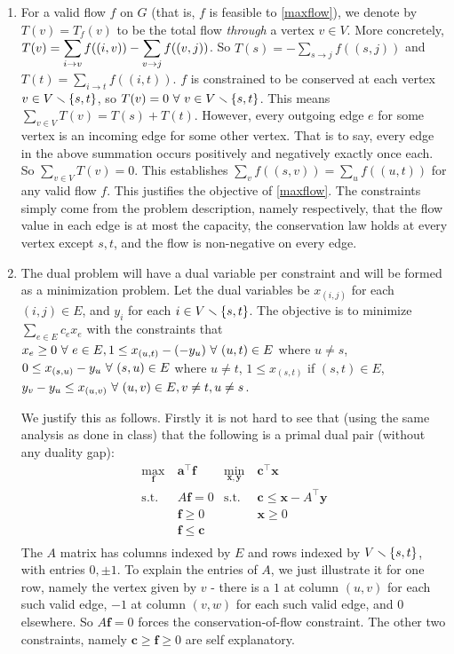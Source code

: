 \soln

\begin{enumerate}[label=(\alph*)]
\item For a valid flow $f$ on $G$ (that is, $f$ is feasible to \ref{maxflow}), we denote by $T(v) = T_{f}(v)$ to be the total flow \textit{through} a vertex $v\in V$. More concretely, $\displaystyle T(v) = \sum_{i\to v} f((i,v)) - \sum_{v\to j} f((v,j))$. So $T(s) = - \sum\limits_{s\to j} f((s,j))$ and $T(t) = \sum\limits_{i\to t} f((i,t))$. $f$ is constrained to be conserved at each vertex $v\in V\smallsetminus\left\{s,t\right\}$, so $T(v) = 0~\forall~ v\in V\smallsetminus\left\{s,t\right\}$. This means $\sum_{v\in V}T(v) = T(s) + T(t)$. However, every outgoing edge $e$ for some vertex is an incoming edge for some other vertex. That is to say, every edge in the above summation occurs positively and negatively exactly once each. So $\sum_{v\in V}T(v)=0$. This establishes $\sum_{v}f((s,v)) = \sum_{u}f((u,t))$ for any valid flow $f$. This justifies the objective of \ref{maxflow}. The constraints simply come from the problem description, namely respectively, that the flow value in each edge is at most the capacity, the conservation law holds at every vertex except $s,t$, and the flow is non-negative on every edge.
\item The dual problem will have a dual variable per constraint and will be formed as a minimization problem. Let the dual variables be $x_{(i,j)}$ for each $(i,j)\in E$, and $y_{i}$ for each $i\in V\smallsetminus\left\{s,t\right\}$. The objective is to minimize $\sum_{e\in E}c_{e}x_{e}$ with the constraints that $x_{e}\ge 0~\forall~ e\in E, 1 \le x_{(u,t)} - (-y_{u})~\forall~ (u,t)\in E$ where $u\ne s$, $0\le x_{(s,u)} - y_{u} ~\forall~ (s,u)\in E$ where $u\ne t$, $1\le x_{(s,t)}$ if $(s,t)\in E$, $y_{v}-y_{u}\le x_{(u,v)}~\forall~ (u,v)\in E, v\ne t, u\ne s$.

We justify this as follows. Firstly it is not hard to see that (using the same analysis as done in class) that the following is a primal dual pair (without any duality gap):
\begin{align*}
\max_{\pmb f}~& \pmb a^{\top}\pmb f & \min_{\pmb x,\pmb y}~ & \pmb c^{\top}\pmb x\\
\text{s.t. }& A\pmb f=0 & \text{s.t. } & \pmb c \le \pmb x - A^{\top}\pmb y\\
& \pmb f\ge 0 & & \pmb x\ge 0\\
& \pmb f\le \pmb c\\
\end{align*}
The $A$ matrix has columns indexed by $E$ and rows indexed by $V\smallsetminus\left\{s,t\right\}$, with entries $0,\pm 1$. To explain the entries of $A$, we just illustrate it for one row, namely the vertex given by $v$ - there is a $1$ at column $(u,v)$ for each such valid edge, $-1$ at column $(v,w)$ for each such valid edge, and $0$ elsewhere. So $A\pmb f=0$ forces the conservation-of-flow constraint. The other two constraints, namely $\pmb c\ge \pmb f\ge 0$ are self explanatory. 


\end{enumerate}
